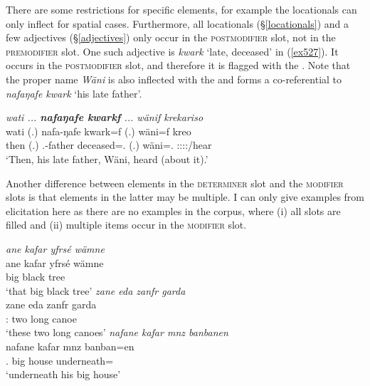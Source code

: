 There are some restrictions for specific elements, for example the locationals can only inflect for spatial cases. Furthermore, all locationals (\S{}\ref{locationals}) and a few adjectives (\S{}\ref{adjectives}) only occur in the \textsc{postmodifier} slot, not in the \textsc{premodifier} slot. One such adjective is \emph{kwark} `late, deceased' in (\ref{ex527}). It occurs in the \textsc{postmodifier} slot, and therefore it is flagged with the  . Note that the proper name \emph{Wäni} is also inflected with the  and forms a  co-referential to \emph{nafaŋafe kwark} `his late father'.

\begin{exe}
	\ex \emph{wati ... \textbf{nafaŋafe kwarkf} ... wänif krekariso}\\
	\gll wati (.) nafa-ŋafe kwark=f (.) wäni=f kreo\\
	then (.) \Third.\Poss-father deceased=\Erg.\Sg{} (.) wäni=\Erg.\Sg{} \Sg:\Sbj:\Irr:\Pfv:\Andat/hear\\
	\trans `Then, his late father, Wäni, heard (about it).'
	\label{ex527}
\end{exe}

Another difference between elements in the \textsc{determiner} slot and the \textsc{modifier} slots is that elements in the latter may be multiple. I can only give examples from elicitation here as there are no examples in the corpus, where (i) all slots are filled and (ii) multiple items occur in the \textsc{modifier} slot.

\begin{exe}
	\ex \label{ex530}
	\begin{xlist}
		\ex \emph{ane kafar yfrsé wämne}\\
		\gll ane kafar yfrsé wämne\\
		\Dem{} big black tree\\
		\trans `that big black tree'
		\label{ex531}
		\ex \emph{zane eda zanfr garda}\\
		\gll zane eda zanfr garda\\
		\Dem:\Prox{} two long canoe\\
		\trans `these two long canoes'
		\label{ex532}
		\ex \emph{nafane kafar mnz banbanen}\\
		\gll nafane kafar mnz banban=en\\
		\Tsg.\Poss{} big house underneath=\Loc\\
		\trans `underneath his big house'
		\label{ex533}
	\end{xlist}
\end{exe}

